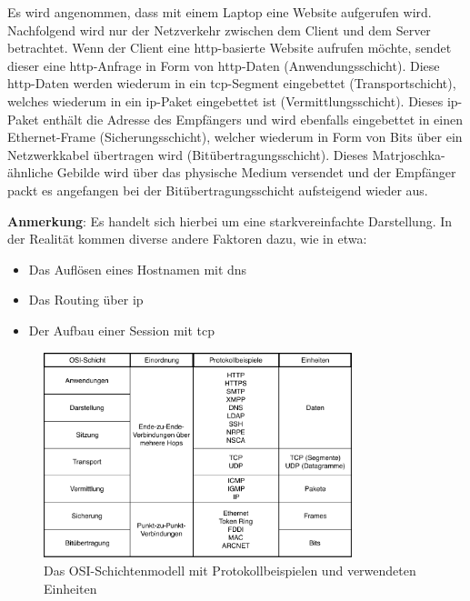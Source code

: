 \documentclass[titlepage]{report}
\begin{document}
Es wird angenommen, dass mit einem Laptop eine Website aufgerufen wird.
Nachfolgend wird nur der Netzverkehr zwischen dem Client und dem Server
betrachtet. Wenn der Client eine \gls{http}\hyp{}basierte Website
aufrufen möchte, sendet dieser eine \gls{http}\hyp{}Anfrage in Form von
\gls{http}\hyp{}Daten (Anwendungsschicht). Diese \gls{http}\hyp{}Daten
werden wiederum in ein \gls{tcp}\hyp{}Segment eingebettet (Transportschicht),
welches wiederum in ein \gls{ip}\hyp{}Paket eingebettet ist
(Vermittlungsschicht). Dieses \gls{ip}\hyp{}Paket enthält die Adresse
des Empfängers und wird ebenfalls eingebettet in einen
Ethernet\hyp{}Frame (Sicherungsschicht), welcher wiederum in Form von
Bits über ein Netzwerkkabel übertragen wird (Bitübertragungsschicht).
Dieses Matrjoschka\hyp{}ähnliche Gebilde wird über das physische
Medium versendet und der Empfänger packt es angefangen bei der
Bitübertragungsschicht aufsteigend wieder aus.

\textbf{Anmerkung}: Es handelt sich hierbei um eine starkvereinfachte
Darstellung. In der Realität kommen diverse andere Faktoren dazu, wie in
etwa:
\begin{itemize}
    \item Das Auflösen eines Hostnamen mit \gls{dns}
    \item Das Routing über \gls{ip}
    \item Der Aufbau einer Session mit \gls{tcp}
\end{itemize}
\begin{figure}[H]
    \centering
    \includegraphics[width=0.8\textwidth]{figures/osi.pdf}
    \caption{Das OSI-Schichtenmodell mit Protokollbeispielen und
    verwendeten Einheiten}\label{fig:2}
\end{figure}
\end{document}
